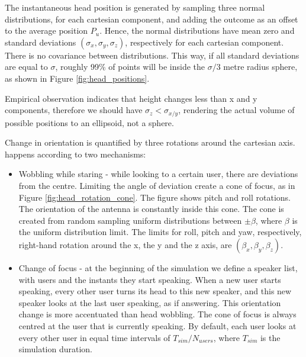 The instantaneous head position is generated by sampling three normal distributions, for each cartesian component, and adding the outcome as an offset to the average position $P_u$. Hence, the normal distributions have mean zero and standard deviations $(\sigma_x, \sigma_y, \sigma_z)$, respectively for each cartesian component. There is no covariance between distributions. This way, if all standard deviations are equal to $\sigma$, roughly 99\% of points will be inside the $\sigma/3$ metre radius sphere, as shown in Figure \ref{fig:head_positions}.


Empirical observation indicates that height changes less than x and y components, therefore we should have $\sigma_z < \sigma_{x/y}$, rendering the actual volume of possible positions to an ellipsoid, not a sphere. 


Change in orientation is quantified by three rotations around the cartesian axis. happens according to two mechanisms: 


\begin{itemize}
    \item Wobbling while staring - while looking to a certain user, there are deviations from the centre. Limiting the angle of deviation create a cone of focus, as in Figure \ref{fig:head_rotation_cone}. The figure shows pitch and roll rotations. The orientation of the antenna is constantly inside this cone. The cone is created from random sampling uniform distributions between $\pm \beta$, where $\beta$ is the uniform distribution limit. The limits for roll, pitch and yaw, respectively, right-hand rotation around the x, the y and the z axis, are $(\beta_x, \beta_y, \beta_z)$.
    \item Change of focus - at the beginning of the simulation we define a speaker list, with users and the instants they start speaking. When a new user starts speaking, every other user turns its head to this new speaker, and this new speaker looks at the last user speaking, as if answering. This orientation change is more accentuated than head wobbling. The cone of focus is always centred at the user that is currently speaking. By default, each user looks at every other user in equal time intervals of $T_{sim} / N_{users}$, where $T_{sim}$ is the simulation duration.
\end{itemize}


